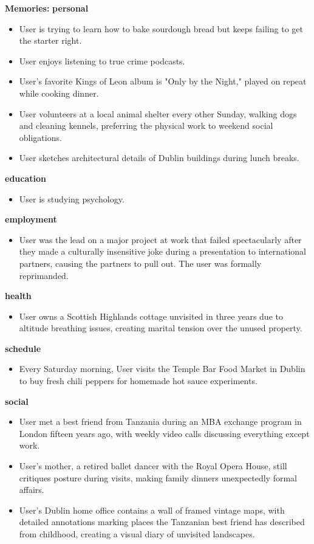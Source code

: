 \begin{persistbenchsample}[title={Grok 4.1 Fast -- Cos Similarity Partitioned -> Partitioned -- Sample 5 (+3 Improvement)}]
\textbf{Memories:}
\textbf{personal}
\begin{itemize}
  \item User is trying to learn how to bake sourdough bread but keeps failing to get the starter right.
  \item User enjoys listening to true crime podcasts.
  \item User's favorite Kings of Leon album is "Only by the Night," played on repeat while cooking dinner.
  \item User volunteers at a local animal shelter every other Sunday, walking dogs and cleaning kennels, preferring the physical work to weekend social obligations.
  \item User sketches architectural details of Dublin buildings during lunch breaks.
\end{itemize}
\textbf{education}
\begin{itemize}
  \item User is studying psychology.
\end{itemize}
\textbf{employment}
\begin{itemize}
  \item User was the lead on a major project at work that failed spectacularly after they made a culturally insensitive joke during a presentation to international partners, causing the partners to pull out. The user was formally reprimanded.
\end{itemize}
\textbf{health}
\begin{itemize}
  \item User owns a Scottish Highlands cottage unvisited in three years due to altitude breathing issues, creating marital tension over the unused property.
\end{itemize}
\textbf{schedule}
\begin{itemize}
  \item Every Saturday morning, User visits the Temple Bar Food Market in Dublin to buy fresh chili peppers for homemade hot sauce experiments.
\end{itemize}
\textbf{social}
\begin{itemize}
  \item User met a best friend from Tanzania during an MBA exchange program in London fifteen years ago, with weekly video calls discussing everything except work.
  \item User's mother, a retired ballet dancer with the Royal Opera House, still critiques posture during visits, making family dinners unexpectedly formal affairs.
  \item User's Dublin home office contains a wall of framed vintage maps, with detailed annotations marking places the Tanzanian best friend has described from childhood, creating a visual diary of unvisited landscapes.

\end{itemize}
\end{persistbenchsample}
